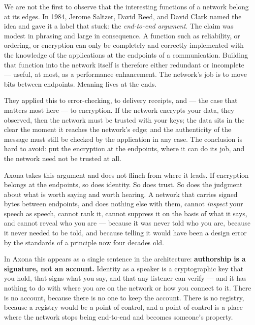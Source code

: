 \documentclass[nobib,justified]{tufte-handout}
\begin{document}
We are not the first to observe that the interesting functions of a network
belong at its edges. In 1984, Jerome Saltzer, David Reed, and David Clark
named the idea and gave it a label that stuck: the \emph{end-to-end
argument}. The claim was modest in phrasing and large in consequence. A
function such as reliability, or ordering, or encryption can only be
completely and correctly implemented with the knowledge of the applications
at the endpoints of a communication. Building that function into the network
itself is therefore either redundant or incomplete --- useful, at most, as a
performance enhancement. The network's job is to move bits between endpoints.
Meaning lives at the ends.

They applied this to error-checking, to delivery receipts, and --- the case
that matters most here --- to encryption. If the network encrypts your data,
they observed, then the network must be trusted with your keys; the data sits
in the clear the moment it reaches the network's edge; and the authenticity of
the message must still be checked by the application in any case. The
conclusion is hard to avoid: put the encryption at the endpoints, where it can
do its job, and the network need not be trusted at all.

Axona takes this argument and does not flinch from where it leads. If
encryption belongs at the endpoints, so does identity. So does trust. So does
the judgment about what is worth saying and worth hearing. A network that
carries signed bytes between endpoints, and does nothing else with them,
cannot \emph{inspect} your speech as speech, cannot rank it, cannot suppress
it on the basis of what it says, and cannot reveal who you are --- because it
was never told who you are, because it never needed to be told, and because
telling it would have been a design error by the standards of a principle now
four decades old.

In Axona this appears as a single sentence in the architecture:
\textbf{authorship is a signature, not an account.} Identity as a speaker is a
cryptographic key that you hold, that signs what you say, and that any listener
can verify --- and it has nothing to do with where you are on the network or
how you connect to it. There is no account, because there is no one to keep the
account. There is no registry, because a registry would be a point of control,
and a point of control is a place where the network stops being end-to-end and
becomes someone's property.
\end{document}
